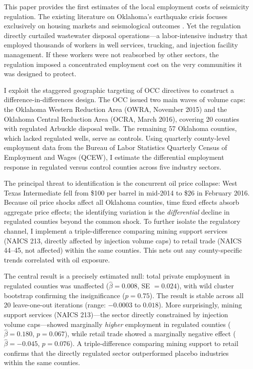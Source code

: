 \documentclass[12pt]{article}
\begin{document}
This paper provides the first estimates of the local employment costs of seismicity regulation. The existing literature on Oklahoma's earthquake crisis focuses exclusively on housing markets \citep{muehlenbachs2015} and seismological outcomes \citep{langenbruch2018, dehaan2023}. Yet the regulation directly curtailed wastewater disposal operations---a labor-intensive industry that employed thousands of workers in well services, trucking, and injection facility management. If these workers were not reabsorbed by other sectors, the regulation imposed a concentrated employment cost on the very communities it was designed to protect.

I exploit the staggered geographic targeting of OCC directives to construct a difference-in-differences design. The OCC issued two main waves of volume caps: the Oklahoma Western Reduction Area (OWRA, November 2015) and the Oklahoma Central Reduction Area (OCRA, March 2016), covering 20 counties with regulated Arbuckle disposal wells. The remaining 57 Oklahoma counties, which lacked regulated wells, serve as controls. Using quarterly county-level employment data from the Bureau of Labor Statistics Quarterly Census of Employment and Wages (QCEW), I estimate the differential employment response in regulated versus control counties across five industry sectors.

The principal threat to identification is the concurrent oil price collapse: West Texas Intermediate fell from \$100 per barrel in mid-2014 to \$26 in February 2016. Because oil price shocks affect all Oklahoma counties, time fixed effects absorb aggregate price effects; the identifying variation is the \emph{differential} decline in regulated counties beyond the common shock. To further isolate the regulatory channel, I implement a triple-difference comparing mining support services (NAICS 213, directly affected by injection volume caps) to retail trade (NAICS 44--45, not affected) within the same counties. This nets out any county-specific trends correlated with oil exposure.

The central result is a precisely estimated null: total private employment in regulated counties was unaffected ($\hat{\beta} = 0.008$, SE $= 0.024$), with wild cluster bootstrap confirming the insignificance ($p = 0.75$). The result is stable across all 20 leave-one-out iterations (range: $-0.0003$ to $0.018$). More surprisingly, mining support services (NAICS 213)---the sector directly constrained by injection volume caps---showed marginally \emph{higher} employment in regulated counties ($\hat{\beta} = 0.180$, $p = 0.067$), while retail trade showed a marginally negative effect ($\hat{\beta} = -0.045$, $p = 0.076$). A triple-difference comparing mining support to retail confirms that the directly regulated sector outperformed placebo industries within the same counties.
\end{document}
